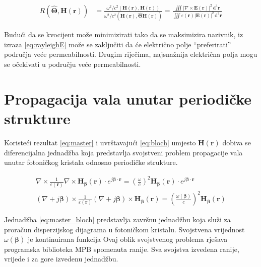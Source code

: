 \documentclass[utf8, seminar]{fer}
\begin{document}
\begin{align}
	R \left( \hat{\mathbf{\Theta}}, \mathbf{H}(\mathbf{r}) \right)
	&= \frac{
		\omega^2/c^2
		\left(
			\mathbf{H}(\mathbf{r}), \mathbf{H}(\mathbf{r})
		\right)
	}
	{
		\omega^2/c^2
		\left(
			\mathbf{H}(\mathbf{r}), \hat{\mathbf{\Theta}}\mathbf{H}(\mathbf{r})
		\right)
	}
	= \frac{
		\iiint |\nabla \times \mathbf{E}(\mathbf{r})|^2
		\, \mathrm{d}^3\mathbf{r}}
	{\iiint \varepsilon(\mathbf{r}) | \mathbf{E}( \mathbf{r} ) |^2
	\, \mathrm{d}^3\mathbf{r}} \label{eq:rayleighE}
\end{align}

Budući da se kvocijent može minimizirati tako da se maksimizira nazivnik, iz
izraza \ref{eq:rayleighE} može se zaključiti da će električno polje
``preferirati'' područja veće permeabilnosti. Drugim riječima,
najsnažnija električna polja mogu se očekivati u području veće permeabilnosti.

\section{Propagacija vala unutar periodičke strukture}

Koristeći rezultat \ref{eq:master} i uvrštavajući \ref{eq:bloch} umjesto
$\mathbf{H}(\mathbf{r})$ dobiva se diferencijalna jednadžba koja predstavlja
svojstveni problem propagacije vala unutar fotoničkog kristala odnosno
periodičke strukture.

\begin{align} \label{eq:master_bloch}
	\nabla \times
	\frac{1}{\varepsilon(\mathbf{r})} \nabla \times
	\mathbf{H}_\mathbf{\beta}(\mathbf{r}) \cdot
	e^{j \mathbf{\beta} \cdot \mathbf{r}}
	= \left(
		\frac{\omega}{c}
	\right)^2
	\mathbf{H}_\mathbf{\beta}(\mathbf{r}) \cdot
		e^{j \mathbf{\beta} \cdot \mathbf{r}}	\nonumber \\
	(\nabla + j\mathbf{\beta}) \times
	\frac{1}{\varepsilon(\mathbf{r})}
	(\nabla + j\mathbf{\beta}) \times
	\mathbf{H}_\mathbf{\beta}(\mathbf{r})
	= \left(
	\frac{\omega (\mathbf{\beta})}{c}
	\right)^2
	\mathbf{H}_\mathbf{\beta}(\mathbf{r})
\end{align}

Jednadžba \ref{eq:master_bloch} predstavlja završnu jednadžbu koja služi za
proračun disperzijskog dijagrama u fotoničkom kristalu. Svojstvena vrijednost
${\omega (\mathbf{\beta})}$ je kontinuirana funkcija
Ovaj oblik
svojstvenog problema rješava programska biblioteka MPB spomenuta ranije. Sva
svojstva izvedena ranije, vrijede i za gore izvedenu jednadžbu.
\end{document}
